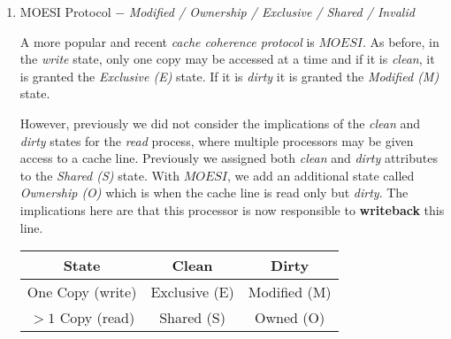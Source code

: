 \documentclass[12pt]{article}
\newenvironment{QandA}{\begin{enumerate}[label=\bfseries\arabic*.]\bfseries}
                      {\end{enumerate}}
\newenvironment{answered}{\par\quad\normalfont}{}
\begin{document}
\begin{QandA}
\item MOESI Protocol $-$ \textit{Modified / Ownership / Exclusive / Shared / Invalid}
\begin{answered}
A more popular and recent \textit{cache coherence protocol} is $MOESI$. As before, in the \textit{write} state, only one copy may be accessed at a time and if it is \textit{clean}, it is granted the \textit{Exclusive (E)} state. If it is \textit{dirty} it is granted the \textit{Modified (M)} state. 

However, previously we did not consider the implications of the \textit{clean} and \textit{dirty} states for the \textit{read} process, where multiple processors may be given access to a cache line. Previously we assigned both \textit{clean} and \textit{dirty} attributes to the \textit{Shared (S)} state. With $MOESI$, we add an additional state called \textit{Ownership (O)} which is when the cache line is read only but \textit{dirty}. The implications here are that this processor is now responsible to \textbf{writeback} this line.

\begin{center}
\begin{tabular}{ |c|c|c| } 
 \hline
 State & Clean & Dirty \\ 
 \hline
 One Copy (write) & Exclusive (E) & Modified (M) \\ 
 $>1$ Copy (read)  & Shared (S) & Owned (O) \\ 
 \hline
\end{tabular}
\end{center}
\end{answered}

\ 


\end{QandA}
\end{document}
